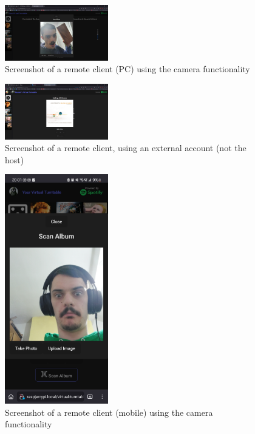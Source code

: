 \begin{uomappendix}
            \begin{figure}[h]
                \centering
                \includegraphics[width=0.4\textwidth]{images/screenshots/LAPTOP_Cam.png}
                \caption{Screenshot of a remote client (PC) using the camera functionality}
                \label{fig:laptopCam}
            \end{figure}
            
            \begin{figure}[h]
                \centering
                \includegraphics[width=0.4\textwidth]{images/screenshots/LAPTOP_External.png}
                \caption{Screenshot of a remote client, using an external account (not the host)}
                \label{fig:laptopExternal}
            \end{figure}
            
            \begin{figure}[h]
                \centering
                \includegraphics[width=0.4\textwidth]{images/screenshots/PHONE_Cam.jpg}
                \caption{Screenshot of a remote client (mobile) using the camera functionality}
                \label{fig:phoneCam}
            \end{figure}
            

\end{uomappendix}
